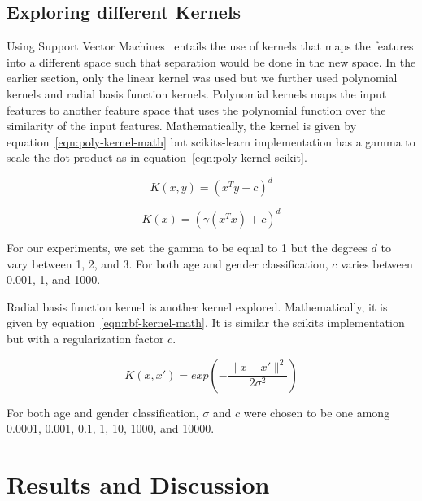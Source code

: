 \documentclass[a4paper]{llncs}
\begin{document}
\subsection{Exploring different Kernels}
Using Support Vector Machines~\cite{cortes1995support} entails the use of kernels that maps the features into a different space such that separation would be done in the new space. In the earlier section, only the linear kernel was used but we further used polynomial kernels and radial basis function kernels. Polynomial kernels maps the input features to another feature space that uses the polynomial function over the similarity of the input features. Mathematically, the kernel is given by equation~\ref{eqn:poly-kernel-math} but scikits-learn implementation has a gamma to scale the dot product as in equation~\ref{eqn:poly-kernel-scikit}.

\begin{equation}
K(x,y) = (x^Ty + c)^d
\label{eqn:poly-kernel-math}
\end{equation}

\begin{equation}
K(x) = (\gamma(x^Tx)+c)^d
\label{eqn:poly-kernel-scikit}
\end{equation}

For our experiments, we set the gamma to be equal to 1 but the degrees $d$ to vary between 1, 2, and 3. For both age and gender classification, $c$ varies between 0.001, 1, and 1000.   

Radial basis function kernel is another kernel explored. Mathematically, it is given by equation~\ref{eqn:rbf-kernel-math}. It is similar the scikits implementation but with a regularization factor $c$. 

\begin{equation}
K(x,x')= exp\left( -\frac{\parallel x-x'\parallel^2}{2\sigma^2} \right)
\label{eqn:rbf-kernel-math}
\end{equation} 

For both age and gender classification, $\sigma$ and $c$ were chosen to be one among 0.0001, 0.001, 0.1, 1, 10, 1000, and 10000.






\section{Results and Discussion}	
\end{document}

